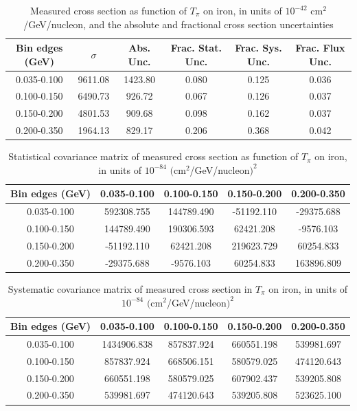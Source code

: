 \documentclass[../main.tex]{subfiles}
\begin{document}
\pagebreak
\begin{turnpage}
\end{turnpage}
\begin{table}
  \centering
  \renewcommand{\arraystretch}{1.15}
  \caption{Measured cross section as function of $T_{\pi}$ on iron, in units of $10^{-42}$ $\text{cm}^2$/GeV/nucleon, and the absolute and fractional cross section uncertainties}
    \begin{tabular}{c||c|c||c|c|c}
      Bin edges (GeV) &  $\sigma$  &  Abs. Unc.  &  Frac. Stat. Unc.  &  Frac. Sys. Unc.  &  Frac. Flux Unc. \\
      \hline
      \hline
      0.035-0.100 & 9611.08 & 1423.80 & 0.080 & 0.125 & 0.036\\
      0.100-0.150 & 6490.73 & 926.72 & 0.067 & 0.126 & 0.037\\
      0.150-0.200 & 4801.53 & 909.68 & 0.098 & 0.162 & 0.037\\
      0.200-0.350 & 1964.13 & 829.17 & 0.206 & 0.368 & 0.042
    \end{tabular}
  \label{tbl:datanucleonnuc26pion_ekina}
\end{table}
\begin{table}
  \centering
  \renewcommand{\arraystretch}{1.15}
  \caption{Statistical covariance matrix of measured cross section as function of $T_{\pi}$ on iron, in units of $10^{-84}$ $(\text{cm}^2$/GeV/nucleon$)^2$}
    \begin{tabular}{c||cccc}
      Bin edges (GeV) & 0.035-0.100 & 0.100-0.150 & 0.150-0.200 & 0.200-0.350\\
      \hline
      \hline
      0.035-0.100 & 592308.755 & 144789.490 & -51192.110 & -29375.688\\
      0.100-0.150 & 144789.490 & 190306.593 & 62421.208 & -9576.103\\
      0.150-0.200 & -51192.110 & 62421.208 & 219623.729 & 60254.833\\
      0.200-0.350 & -29375.688 & -9576.103 & 60254.833 & 163896.809
    \end{tabular}
  \label{tbl:statnucleonnuc26pion_ekinb}
\end{table}
\begin{table}
  \centering
  \renewcommand{\arraystretch}{1.15}
  \caption{Systematic covariance matrix of measured cross section in $T_{\pi}$ on iron, in units of $10^{-84}$ $(\text{cm}^2$/GeV/nucleon$)^2$}
    \begin{tabular}{c||cccc}
      Bin edges (GeV) & 0.035-0.100 & 0.100-0.150 & 0.150-0.200 & 0.200-0.350\\
      \hline
      \hline
      0.035-0.100 & 1434906.838 & 857837.924 & 660551.198 & 539981.697\\
      0.100-0.150 & 857837.924 & 668506.151 & 580579.025 & 474120.643\\
      0.150-0.200 & 660551.198 & 580579.025 & 607902.437 & 539205.808\\
      0.200-0.350 & 539981.697 & 474120.643 & 539205.808 & 523625.100
    \end{tabular}
  \label{tbl:sysnucleonnuc26pion_ekinc}
\end{table}
\end{document}

